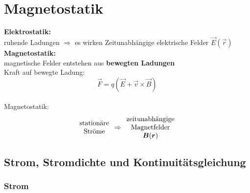 \chapter{Magnetostatik}

\textbf{Elektrostatik:}\\
ruhende Ladungen $ \Rightarrow $ es wirken Zeitunabhängige elektrische Felder $ \vec{E}(\vec{r}) $\\[5pt]
\textbf{Magnetostatik:}\\
magnetische Felder entstehen aus \textbf{bewegten Ladungen}\\
Kraft auf bewegte Ladung:
\begin{equation*}
\vec{F} = q (\vec{E} + \vec{v} \times \vec{B})
\end{equation*}
\\[3pt]
Magnetostatik:
$$ \begin{array}{c}
\textrm{stationäre}\\ \textrm{Ströme}
\end{array} \Rightarrow \begin{array}{c}
\textrm{zeitunabhängige} \\ \textrm{Magnetfelder} \\ \bm{B}(\bm{r})
\end{array} $$

\section{Strom, Stromdichte und Kontinuitätsgleichung}

\subsection{Strom}

